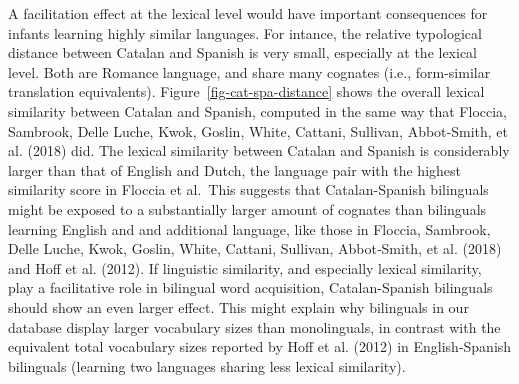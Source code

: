 \documentclass[
  12pt,
  b5paperpaper,
  twoside]{scrreprt}
\begin{document}
A facilitation effect at the lexical level would have important
consequences for infants learning highly similar languages. For intance,
the relative typological distance between Catalan and Spanish is very
small, especially at the lexical level. Both are Romance language, and
share many cognates (i.e., form-similar translation equivalents).
Figure~\ref{fig-cat-spa-distance} shows the overall lexical similarity
between Catalan and Spanish, computed in the same way that Floccia,
Sambrook, Delle Luche, Kwok, Goslin, White, Cattani, Sullivan,
Abbot‐Smith, et al. (2018) did. The lexical similarity between Catalan
and Spanish is considerably larger than that of English and Dutch, the
language pair with the highest similarity score in Floccia et al.~This
suggests that Catalan-Spanish bilinguals might be exposed to a
substantially larger amount of cognates than bilinguals learning English
and and additional language, like those in Floccia, Sambrook, Delle
Luche, Kwok, Goslin, White, Cattani, Sullivan, Abbot‐Smith, et al.
(2018) and Hoff et al. (2012). If linguistic similarity, and especially
lexical similarity, play a facilitative role in bilingual word
acquisition, Catalan-Spanish bilinguals should show an even larger
effect. This might explain why bilinguals in our database display larger
vocabulary sizes than monolinguals, in contrast with the equivalent
total vocabulary sizes reported by Hoff et al. (2012) in English-Spanish
bilinguals (learning two languages sharing less lexical similarity).
\end{document}
